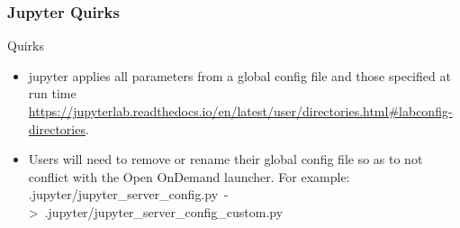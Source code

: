 \begin{frame}
  \frametitle{Jupyter Quirks}
	\begin{block}{Quirks}
			\begin{itemize}
			\item jupyter applies all parameters from a global config file and those specified at run time \url{https://jupyterlab.readthedocs.io/en/latest/user/directories.html\#labconfig-directories}.
			\item Users will need to remove or rename their global config file so as to not conflict with the Open OnDemand launcher. For example:\\ .jupyter/jupyter\_server\_config.py~->~.jupyter/jupyter\_server\_config\_custom.py
		\end{itemize}
	\end{block}
\end{frame}


